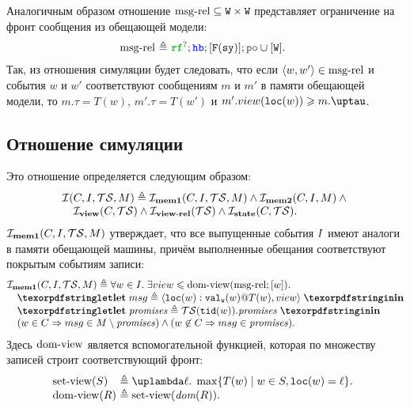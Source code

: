   Аналогичным образом отношение ${\rm msg\text{-}rel} \subseteq {\mathtt{W}} \times {\mathtt{W}}$ представляет ограничение на фронт сообщения
  из обещающей модели:
  \[\begin{array}{@{}r@{~}r@{~}l}
  \msgRel & \defeq & \lRF^{?}; \lHB; [\lDMBSY]; \lPO \cup [\lW]. \\
  \end{array}\]
  Так, из отношения симуляции будет следовать, что если ${\langle{w, w'}\rangle} \in {\rm msg\text{-}rel}$ и события $w$ и $w'$ соответствуют
  сообщениям $m$ и $m'$ в памяти обещающей модели, то $m.\tau = T(w)$, $m'.\tau = T(w')$ и
  $m'.\view(\lLOC(w)) \ge m.\tau$.
  
  \subsection{Отношение симуляции}%
  Это отношение определяется следующим образом:
  \[\inarr{
    \simRel(C, \IssuedSet, \TSf, M) \defeq \invMemOne(C, \IssuedSet, \TSf, M) \land  \invMemTwo(C, \IssuedSet, M) \land {} \\
    \quad \invView(C, \TSf) \land \invViewRel(\TSf) \land \invState(C, \TSf).
  }\]
  $\mathcal{I}_{\rm \bf mem1}(C, I, \mathcal{TS}, M)$ утверждает, что все выпущенные
  события $I$ имеют аналоги в памяти обещающей машины, причём выполненные обещания соответствуют покрытым
  событиям записи:
  \[\inarr{
  \invMemOne(C, \IssuedSet, \TSf, M) \defeq \forall w \in \IssuedSet. \; \exists \view \le \domView(\msgRel; [w]). \; \\
  \quad \letdef{msg}{\msg{\lLOC(w)}{\lVALW(w)}{T(w)}{\view}} \\
  \quad \letdef{\PromSet}{\TSf(\lTID(w)).\PromSet} \\
  \quad (w \in  C \implies msg \in M \setminus \PromSet) \land (w \nin C \implies msg \in \PromSet). \\
  }\]
  Здесь ${\rm dom\text{-}view}$ является вспомогательной функцией, которая по множеству записей строит соответствующий фронт:
  \[\begin{array}{@{}l@{~}l}
    \setView(S) & \defeq \lambda \loc. \; \max \{ T(w) \mid w \in S, \lLOC(w) = \loc\}. \\
    \domView(R) & \defeq \setView(\dom{R}). \\
  \end{array}\]
  

